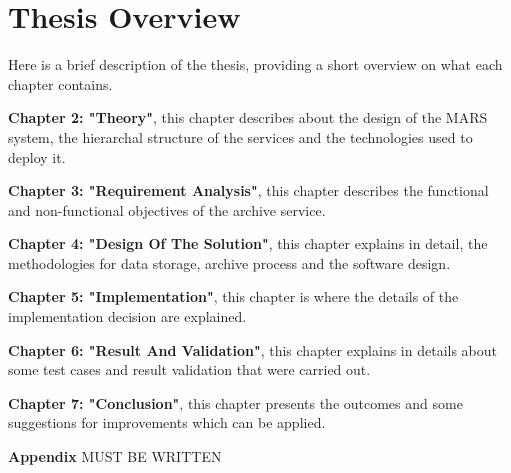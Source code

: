     

    \section{Thesis Overview}
        Here is a brief description of the thesis, providing a short overview on what each
        chapter contains.
        
        \par
        \textbf{Chapter 2: "Theory"}, this chapter describes about the design
        of the MARS system, the hierarchal structure of the services and the technologies used to
        deploy it.

        \par
        \textbf{Chapter 3: "Requirement Analysis"}, this chapter describes the functional and
        non-functional objectives of the archive service.

        \par
        \textbf{Chapter 4: "Design Of The Solution"}, this chapter explains in detail, the 
        methodologies for data storage, archive process and the software design.

        \par
        \textbf{Chapter 5: "Implementation"}, this chapter is where the details of the 
        implementation decision are explained.

        \par
        \textbf{Chapter 6: "Result And Validation"}, this chapter explains in details about 
        some test cases and result validation that were carried out.

        \par
        \textbf{Chapter 7: "Conclusion"}, this chapter presents the outcomes and some 
        suggestions for improvements which can be applied.
        
        \par
        \textbf{Appendix}
        MUST BE WRITTEN

